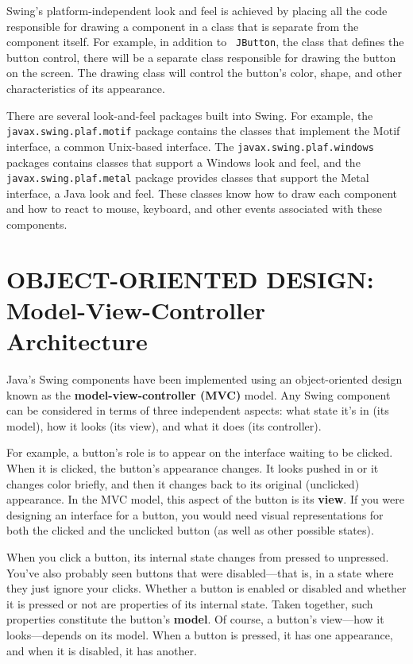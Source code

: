 Swing's platform-independent look and feel is achieved by placing all
the code responsible for drawing a component in a class that is
separate from the component itself.  For example, in addition to {\tt
JButton}, the class that defines the button control, there will be a
separate class responsible for drawing the button on the screen.  The
drawing class will control the button's color, shape, and other
characteristics of its appearance.

There are several look-and-feel packages built into Swing.  For
example, the {\tt javax.swing.plaf.motif} package contains the classes
that implement the Motif interface, a common Unix-based interface.
The {\tt javax.swing.plaf.windows} packages contains classes that
support a Windows look and feel, and the {\tt javax.swing.plaf.metal}
package provides classes that support the Metal interface, a Java look
and feel. These classes know how to draw each component and how to
react to mouse, keyboard, and other events associated with these
components.  


\section{OBJECT-ORIENTED DESIGN:  \\Model-View-Controller Architecture}
\label{objectorienteddesign-model-view-controller-architecture}

\noindent Java's Swing components have been implemented using an
object-oriented design known as the {\bf model-view-controller (MVC)}
model.  Any Swing component can be considered in terms of three
independent aspects: what state it's in (its model), how it looks (its
view), and what it does (its controller).

For example, a button's role is to appear on the interface waiting to
be clicked.   When it is clicked, the button's appearance changes.  It
looks pushed in or it changes color briefly, and then it changes back
to its original (unclicked) appearance.   In the MVC model, this aspect
of the button is its {\bf view}. If you were designing an interface
for a button, you would need visual representations for both the
clicked and the unclicked button (as well as other possible states).

When you click a button, its internal state changes from pressed to
unpressed.  You've also probably seen buttons that were
disabled---that is, in a state where they just ignore your clicks.
Whether a button is enabled or disabled and whether it is pressed or
not are properties of its internal state.  Taken together, such properties
constitute the button's {\bf model}.  Of
course, a button's view---how it looks---depends on its model.  When a
button is pressed, it has one appearance, and when it is disabled, it
has another.

